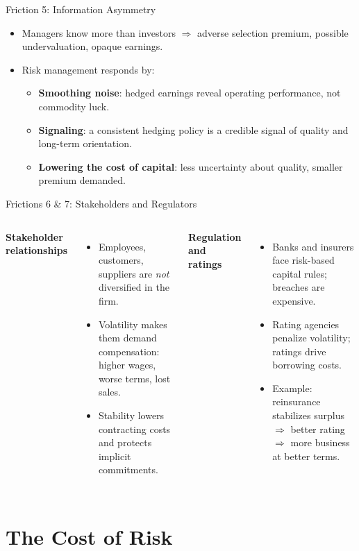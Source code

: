 \documentclass[11pt, aspectratio=169]{beamer}
\begin{document}
\begin{frame}{Friction 5: Information Asymmetry}
\begin{itemize}
  \item Managers know more than investors $\Rightarrow$ adverse selection premium, possible undervaluation, opaque earnings.
  \item Risk management responds by:
  \begin{itemize}
    \item \textbf{Smoothing noise}: hedged earnings reveal operating performance, not commodity luck.
    \item \textbf{Signaling}: a consistent hedging policy is a credible signal of quality and long-term orientation.
    \item \textbf{Lowering the cost of capital}: less uncertainty about quality, smaller premium demanded.
  \end{itemize}
\end{itemize}
\end{frame}

\begin{frame}{Frictions 6 \& 7: Stakeholders and Regulators}
\begin{columns}[T]
\textbf{Stakeholder relationships}
\begin{itemize}
  \item Employees, customers, suppliers are \emph{not} diversified in the firm.
  \item Volatility makes them demand compensation: higher wages, worse terms, lost sales.
  \item Stability lowers contracting costs and protects implicit commitments.
\end{itemize}
\textbf{Regulation and ratings}
\begin{itemize}
  \item Banks and insurers face risk-based capital rules; breaches are expensive.
  \item Rating agencies penalize volatility; ratings drive borrowing costs.
  \item Example: reinsurance stabilizes surplus $\Rightarrow$ better rating $\Rightarrow$ more business at better terms.
\end{itemize}
\end{columns}
\end{frame}

\section{The Cost of Risk}
\end{document}
